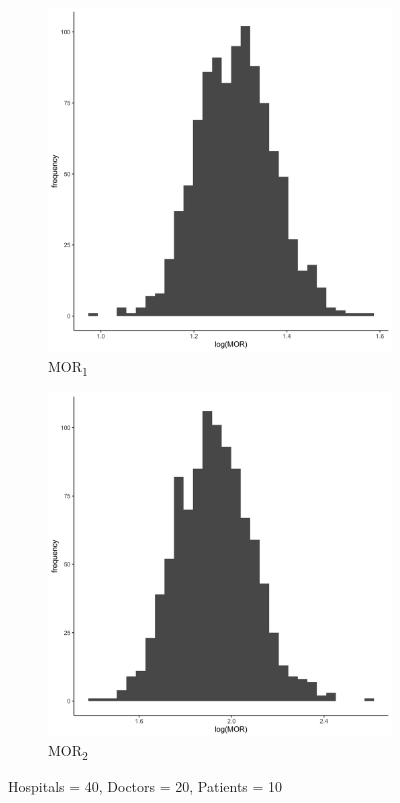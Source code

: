 \documentclass[
  letterpaper,
  DIV=11,
  numbers=noendperiod,
  titlepage]{scrartcl}
\begin{document}
\vspace{15mm}

\begin{figure}
\centering
\begin{subfigure}{.49\textwidth}
    \centering
    \includegraphics[width=.95\linewidth]{../../plots/three-lvl-ran-int/low-prev/hist_40_20_10_three_lvl_low_prev_mor1.png}  
    \caption{MOR\textsubscript{1}}
    \label{l40m20n101}
\end{subfigure}
\begin{subfigure}{.49\textwidth}
    \centering
    \includegraphics[width=.95\linewidth]{../../plots/three-lvl-ran-int/low-prev/hist_40_20_10_three_lvl_low_prev_mor2.png}
    \caption{MOR\textsubscript{2}}
    \label{l40m20n102}
\end{subfigure}
\caption{Hospitals = 40, Doctors = 20, Patients = 10}
\label{mor2}
\end{figure}
\end{document}
